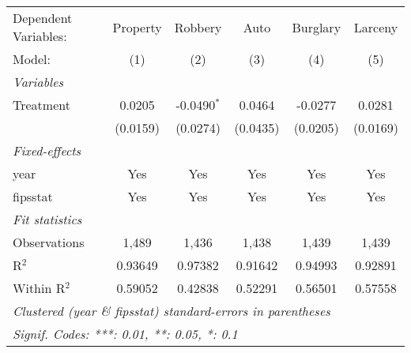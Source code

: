 \begingroup
\centering
\begin{tabular}{lccccc}
   \tabularnewline \midrule \midrule
   Dependent Variables: & Property & Robbery       & Auto     & Burglary & Larceny\\  
   Model:               & (1)      & (2)           & (3)      & (4)      & (5)\\  
   \midrule
   \emph{Variables}\\
   Treatment            & 0.0205   & -0.0490$^{*}$ & 0.0464   & -0.0277  & 0.0281\\   
                        & (0.0159) & (0.0274)      & (0.0435) & (0.0205) & (0.0169)\\   
   \midrule
   \emph{Fixed-effects}\\
   year                 & Yes      & Yes           & Yes      & Yes      & Yes\\  
   fipsstat             & Yes      & Yes           & Yes      & Yes      & Yes\\  
   \midrule
   \emph{Fit statistics}\\
   Observations         & 1,489    & 1,436         & 1,438    & 1,439    & 1,439\\  
   R$^2$                & 0.93649  & 0.97382       & 0.91642  & 0.94993  & 0.92891\\  
   Within R$^2$         & 0.59052  & 0.42838       & 0.52291  & 0.56501  & 0.57558\\  
   \midrule \midrule
   \multicolumn{6}{l}{\emph{Clustered (year \& fipsstat) standard-errors in parentheses}}\\
   \multicolumn{6}{l}{\emph{Signif. Codes: ***: 0.01, **: 0.05, *: 0.1}}\\
\end{tabular}
\par\endgroup


